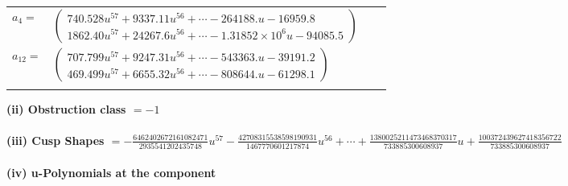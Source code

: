 \documentclass[1p]{elsarticle_modified}
\theoremstyle{definition}
\begin{document}
\begin{tabular}{m{7pt} m{180pt} m{7pt} m{180pt} }
\flushright $a_{4}=$&$\begin{pmatrix}740.528 u^{57}+9337.11 u^{56}+\cdots-264188. u-16959.8\\1862.40 u^{57}+24267.6 u^{56}+\cdots-1.31852\times10^{6} u-94085.5\end{pmatrix}$ \\
\flushright $a_{12}=$&$\begin{pmatrix}707.799 u^{57}+9247.31 u^{56}+\cdots-543363. u-39191.2\\469.499 u^{57}+6655.32 u^{56}+\cdots-808644. u-61298.1\end{pmatrix}$\\&\end{tabular}
\flushleft \textbf{(ii) Obstruction class $= -1$}\\~\\
\flushleft \textbf{(iii) Cusp Shapes $= -\frac{6462402672161082471}{2935541202435748} u^{57}-\frac{42708315538598190931}{1467770601217874} u^{56}+\cdots+\frac{1380025211473468370317}{733885300608937} u+\frac{100372439627418356722}{733885300608937}$}\\~\\
\newpage\renewcommand{\arraystretch}{1}
\flushleft \textbf{(iv) u-Polynomials at the component}\newline \\
\end{document}

